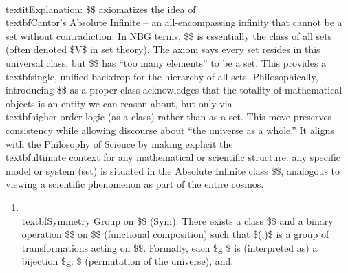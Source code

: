 \documentclass[11pt]{article}
\begin{document}
\begin{enumerate}
  \item \\textbf{Absolute Infinite Class (\$\infty\$):} \$\infty\$ is a distinguished proper class that contains every set: \$\forall x,\[\mathsf{Set}(x) \rightarrow x \in \infty]\$. Moreover, \$\neg\mathsf{Set}(\infty)\$ (so \$\infty\$ is not itself a set).
\end{enumerate}
    \\textit{Explanation:} \$\infty\$ axiomatizes the idea of \\textbf{Cantor’s Absolute Infinite} – an all-encompassing infinity that cannot be a set without contradiction. In NBG terms, \$\infty\$ is essentially the class of all sets (often denoted \$V\$ in set theory). The axiom says every set resides in this universal class, but \$\infty\$ has “too many elements” to be a set. This provides a \\textbf{single, unified backdrop} for the hierarchy of all sets. Philosophically, introducing \$\infty\$ as a proper class acknowledges that the totality of mathematical objects is an entity we can reason about, but only via \\textbf{higher-order} logic (as a class) rather than as a set. This move preserves consistency while allowing discourse about “the universe as a whole.” It aligns with the Philosophy of Science by making explicit the \\textbf{ultimate context} for any mathematical or scientific structure: any specific model or system (set) is situated in the Absolute Infinite class \$\infty\$, analogous to viewing a scientific phenomenon as part of the entire cosmos.

\begin{enumerate}
  \item \\textbf{Symmetry Group on \$\infty\$ (Sym):} There exists a class \$\Sym\$ and a binary operation \$\circ\$ on \$\Sym\$ (functional composition) such that \$(\Sym,\circ)\$ is a group of transformations acting on \$\infty\$. Formally, each \$g \in \Sym\$ is (interpreted as) a bijection \$g: \infty \to \infty\$ (permutation of the universe), and:
\end{enumerate}
\end{document}
